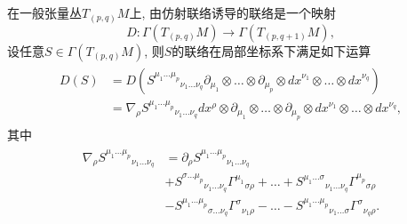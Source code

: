\begin{definition}
  在一般张量丛$T_{(p, q)}M$上, 由仿射联络诱导的联络是一个映射
  $$D:\varGamma(T_{(p, q)}M)\rightarrow\varGamma(T_{(p, q+1)}M), $$
  设任意$S\in \varGamma(T_{(p, q)}M)$, 则$S$的联络在局部坐标系下满足如下运算
  \begin{eqnarray}
    \begin{aligned}
      D(S)&=D({S^{\mu_1\dots\mu_p}}_{\nu_1\dots\nu_q}\partial_{\mu_1}\otimes\dots\otimes\partial_{\mu_p}\otimes{dx}^{\nu_1}\otimes\dots\otimes{dx}^{\nu_q})\\
      &=\nabla_{\rho}{S^{\mu_1\dots\mu_p}}_{\nu_1\dots\nu_q}dx^\rho\otimes\partial_{\mu_1}\otimes\dots\otimes\partial_{\mu_p}\otimes{dx}^{\nu_1}\otimes\dots\otimes{dx}^{\nu_q},
    \end{aligned}
  \end{eqnarray}
  其中
  \begin{eqnarray}
  \begin{aligned}
      \nabla_{\rho}{S^{\mu_1\dots\mu_p}}_{\nu_1\dots\nu_q}&=\partial_\rho{S^{\mu_1\dots\mu_p}}_{\nu_1\dots\nu_q}\\
      &+{S^{\sigma\dots\mu_p}}_{\nu_1\dots\nu_q}{\varGamma^{\mu_1}}_{\sigma\rho}+\dots+{S^{\mu_1\dots\sigma}}_{\nu_1\dots\nu_q}{\varGamma^{\mu_p}}_{\sigma\rho}\\
      &-{S^{\mu_1\dots\mu_p}}_{\sigma\dots\nu_q}{\varGamma^{\sigma}}_{\nu_1\rho}-\dots-{S^{\mu_1\dots\mu_p}}_{\nu_1\dots\sigma}{\varGamma^{\sigma}}_{\nu_q\rho}.
    \end{aligned}
\end{eqnarray}
\end{definition}
